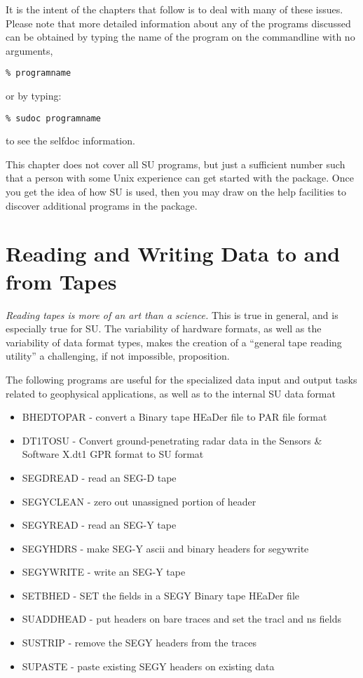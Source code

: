 {{{It is the intent of the chapters that follow is to deal with
many of these issues.
Please note that more detailed information about any
of the programs discussed can be obtained by typing the name
of the program on the commandline with no arguments,
{\small\begin{verbatim}
% programname
\end{verbatim}} \noindent
or by typing:
{\small\begin{verbatim}
% sudoc programname
\end{verbatim} } \noindent
to see the selfdoc information.

This chapter does not cover all SU programs, but just a sufficient
number such that a person with some Unix experience can get started
with the package. Once you get the idea of how SU is used, then 
you may draw on the help facilities to discover additional programs
in the package.

\section{Reading and Writing Data to and from Tapes}

{\em Reading tapes is more of an art than a science.\/} This is
true in general, and is especially true for SU.
The variability of hardware formats, as well as the variability
of data format types, makes the creation of a ``general tape
reading utility'' a challenging, if not impossible, proposition.

The following programs are useful for the specialized data input and output
tasks related to geophysical applications, as well as to the internal
SU data format
\begin{itemize}
\item BHEDTOPAR - convert a Binary tape HEaDer file to PAR file format
\item DT1TOSU - Convert ground-penetrating radar data in the 
Sensors \& Software X.dt1 GPR format to SU format
\item SEGDREAD - read an SEG-D tape 
\item SEGYCLEAN - zero out unassigned portion of header
\item SEGYREAD - read an SEG-Y tape 
\item SEGYHDRS - make SEG-Y ascii and binary headers for segywrite
\item SEGYWRITE - write an SEG-Y tape 
\item SETBHED - SET the fields in a SEGY Binary tape HEaDer file
\item SUADDHEAD - put headers on bare traces and set the tracl and ns fields 
\item SUSTRIP - remove the SEGY headers from the traces 
\item SUPASTE - paste existing SEGY headers on existing data
\end{itemize}

}}}
